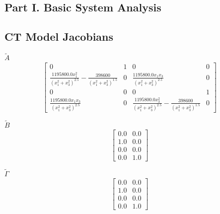 \documentclass[11pt, a4paper]{article}
\begin{document}
\subsection{Part I. Basic System Analysis}

\subsection{CT Model Jacobians}

$\tilde{A}$
$$\left[\begin{matrix}0 & 1 & 0 & 0\\\frac{1195800.0 x_{1}^{2}}{\left(x_{1}^{2} + x_{3}^{2}\right)^{2.5}} - \frac{398600}{\left(x_{1}^{2} + x_{3}^{2}\right)^{1.5}} & 0 & \frac{1195800.0 x_{1} x_{3}}{\left(x_{1}^{2} + x_{3}^{2}\right)^{2.5}} & 0\\0 & 0 & 0 & 1\\\frac{1195800.0 x_{1} x_{3}}{\left(x_{1}^{2} + x_{3}^{2}\right)^{2.5}} & 0 & \frac{1195800.0 x_{3}^{2}}{\left(x_{1}^{2} + x_{3}^{2}\right)^{2.5}} - \frac{398600}{\left(x_{1}^{2} + x_{3}^{2}\right)^{1.5}} & 0\end{matrix}\right]$$

$\tilde{B}$
$$\left[\begin{matrix}0.0 & 0.0\\1.0 & 0.0\\0.0 & 0.0\\0.0 & 1.0\end{matrix}\right]$$

$\tilde{\Gamma}$
$$\left[\begin{matrix}0.0 & 0.0\\1.0 & 0.0\\0.0 & 0.0\\0.0 & 1.0\end{matrix}\right]$$
\end{document}
